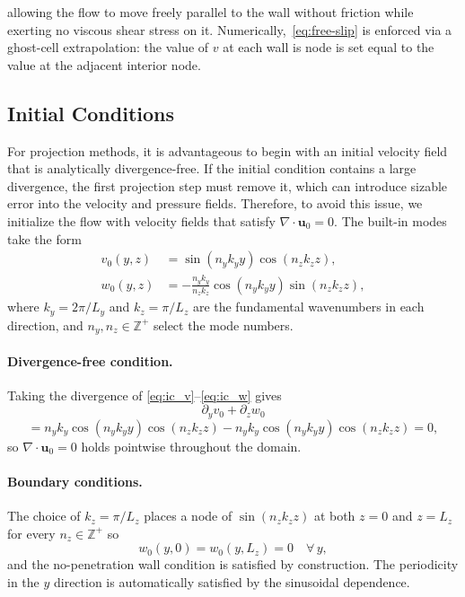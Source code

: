 allowing the flow to move freely parallel to the wall without friction while exerting no viscous shear stress on it. 
Numerically,~\eqref{eq:free-slip} is enforced via a ghost-cell extrapolation: the value of $v$ at each wall is node is set equal to the value at the adjacent interior node.

\subsection{Initial Conditions}\label{sec:ic}

For projection methods, it is advantageous to begin with an initial velocity field that is analytically divergence-free. If the initial condition contains a large divergence, the first projection step must remove it, which can introduce sizable error into the velocity and pressure fields. Therefore, to avoid this issue, we initialize the flow with velocity fields that satisfy $\nabla\cdot\mathbf{u}_0 = 0$. The built-in modes take the form
\begin{align}
    v_0(y,z) &= \sin(n_y k_y y)\cos(n_z k_z z), \label{eq:ic_v} \\
    w_0(y,z) &= -\frac{n_y k_y}{n_z k_z}\cos(n_y k_y y)\sin(n_z k_z z),
    \label{eq:ic_w}
\end{align}
where $k_y = 2\pi/L_y$ and $k_z = \pi/L_z$ are the fundamental wavenumbers in each direction, and $n_y, n_z \in \mathbb{Z}^+$ select the mode numbers. 

\paragraph{Divergence-free condition.}
Taking the divergence of \eqref{eq:ic_v}--\eqref{eq:ic_w} gives 
\begin{equation}
    \partial_y v_0 + \partial_z w_0
\end{equation}
\begin{equation}
    = n_y k_y \cos(n_y k_y y)\cos(n_z k_z z)
    - n_y k_y \cos(n_y k_y y)\cos(n_z k_z z) = 0,
\end{equation}
so $\nabla\cdot\mathbf{u}_0 = 0$ holds pointwise throughout the domain.

\paragraph{Boundary conditions.}
The choice of $k_z = \pi/L_z$ places a node of $\sin(n_z k_z z)$ at both $z = 0$ and $z = L_z$ for every $n_z \in \mathbb{Z}^+$ so
\begin{equation}
    w_0(y, 0) = w_0(y, L_z) = 0 \quad \forall\, y,
\end{equation}
and the no-penetration wall condition is satisfied by construction. The periodicity in the $y$ direction is automatically satisfied by the sinusoidal dependence.

